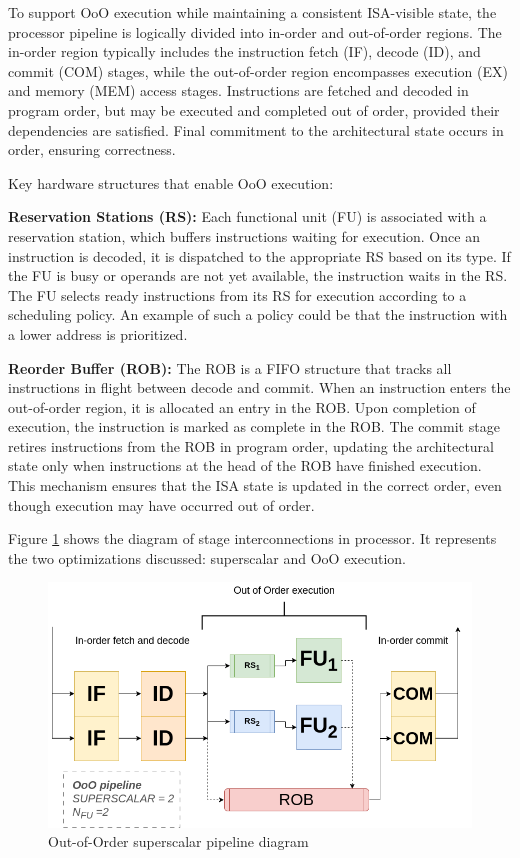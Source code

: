To support OoO execution while maintaining a consistent ISA-visible state, the processor pipeline is logically divided into in-order and out-of-order regions. The in-order region typically includes the instruction fetch (IF), decode (ID), and commit (COM) stages, while the out-of-order region encompasses execution (EX) and memory (MEM) access stages. Instructions are fetched and decoded in program order, but may be executed and completed out of order, provided their dependencies are satisfied. Final commitment to the architectural state occurs in order, ensuring correctness.

Key hardware structures that enable OoO execution:

\textbf{Reservation Stations (RS):} Each functional unit (FU) is associated with a reservation station, which buffers instructions waiting for execution. Once an instruction is decoded, it is dispatched to the appropriate RS based on its type. If the FU is busy or operands are not yet available, the instruction waits in the RS. The FU selects ready instructions from its RS for execution according to a scheduling policy. An example of such a policy could be that the instruction with a lower address is prioritized.

\textbf{Reorder Buffer (ROB):} The ROB is a FIFO structure that tracks all instructions in flight between decode and commit. When an instruction enters the out-of-order region, it is allocated an entry in the ROB. Upon completion of execution, the instruction is marked as complete in the ROB. The commit stage retires instructions from the ROB in program order, updating the architectural state only when instructions at the head of the ROB have finished execution. This mechanism ensures that the ISA state is updated in the correct order, even though execution may have occurred out of order.

Figure \ref{fig:ooo-pipeline} shows the diagram of stage interconnections in processor. It represents the two optimizations discussed: superscalar and OoO execution.

\begin{figure}[H]
    \centering
    \includegraphics[width=0.6 \textwidth]{figures/ooo-pipeline.png}
    \caption{Out-of-Order superscalar pipeline diagram}
    \label{fig:ooo-pipeline}
\end{figure}

